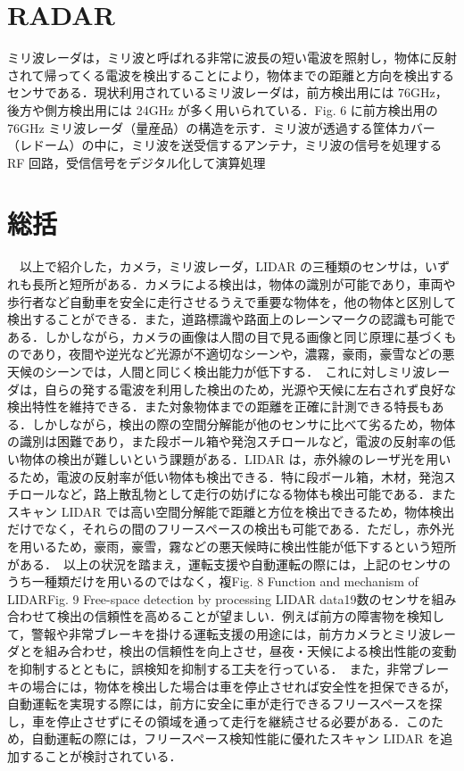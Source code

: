 \section{RADAR}
ミリ波レーダは，ミリ波と呼ばれる非常に波長の短い電波を照射し，物体に反射されて帰ってくる電波を検出することにより，物体までの距離と方向を検出するセンサである．現状利用されているミリ波レーダは，前方検出用には 76GHz，後方や側方検出用には 24GHz が多く用いられている．Fig. 6 に前方検出用の 76GHz ミリ波レーダ（量産品）の構造を示す．ミリ波が透過する筐体カバー（レドーム）の中に，ミリ波を送受信するアンテナ，ミリ波の信号を処理する RF 回路，受信信号をデジタル化して演算処理

\section{総括}
　以上で紹介した，カメラ，ミリ波レーダ，LIDAR の三種類のセンサは，いずれも長所と短所がある．カメラによる検出は，物体の識別が可能であり，車両や歩行者など自動車を安全に走行させるうえで重要な物体を，他の物体と区別して検出することができる．また，道路標識や路面上のレーンマークの認識も可能である．しかしながら，カメラの画像は人間の目で見る画像と同じ原理に基づくものであり，夜間や逆光など光源が不適切なシーンや，濃霧，豪雨，豪雪などの悪天候のシーンでは，人間と同じく検出能力が低下する．　これに対しミリ波レーダは，自らの発する電波を利用した検出のため，光源や天候に左右されず良好な検出特性を維持できる．また対象物体までの距離を正確に計測できる特長もある．しかしながら，検出の際の空間分解能が他のセンサに比べて劣るため，物体の識別は困難であり，また段ボール箱や発泡スチロールなど，電波の反射率の低い物体の検出が難しいという課題がある．LIDAR は，赤外線のレーザ光を用いるため，電波の反射率が低い物体も検出できる．特に段ボール箱，木材，発泡スチロールなど，路上散乱物として走行の妨げになる物体も検出可能である．またスキャン LIDAR では高い空間分解能で距離と方位を検出できるため，物体検出だけでなく，それらの間のフリースペースの検出も可能である．ただし，赤外光を用いるため，豪雨，豪雪，霧などの悪天候時に検出性能が低下するという短所がある．　以上の状況を踏まえ，運転支援や自動運転の際には，上記のセンサのうち一種類だけを用いるのではなく，複Fig. 8 Function and mechanism of LIDARFig. 9 Free-space detection by processing LIDAR data19数のセンサを組み合わせて検出の信頼性を高めることが望ましい．例えば前方の障害物を検知して，警報や非常ブレーキを掛ける運転支援の用途には，前方カメラとミリ波レーダとを組み合わせ，検出の信頼性を向上させ，昼夜・天候による検出性能の変動を抑制するとともに，誤検知を抑制する工夫を行っている．　また，非常ブレーキの場合には，物体を検出した場合は車を停止させれば安全性を担保できるが，自動運転を実現する際には，前方に安全に車が走行できるフリースペースを探し，車を停止させずにその領域を通って走行を継続させる必要がある．このため，自動運転の際には，フリースペース検知性能に優れたスキャン LIDAR を追加することが検討されている．
